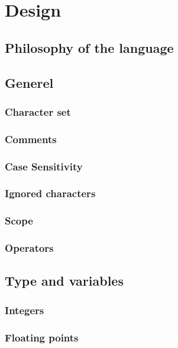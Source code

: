 \chapter{Design}
\label{cha:Design}
\section{Philosophy of the language}


\section{Generel}
\subsection{Character set}

\subsection{Comments}

\subsection{Case Sensitivity}

\subsection{Ignored characters}

\subsection{Scope}

\subsection{Operators}

\section{Type and variables}\label{Types}
\subsection{Integers}

\subsection{Floating points}

